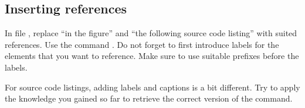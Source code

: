 \subsection{Inserting references}

In file , replace \enquote{in the 
figure} and \enquote{the following source code listing} with suited references. 
Use the command . Do not forget to first 
introduce labels for the elements that you want to reference. 
Make sure to use suitable prefixes before the labels.

For source code listings, adding labels and captions is a bit different.
Try to apply the knowledge you gained so far to retrieve the correct version of the \code{} command. 
